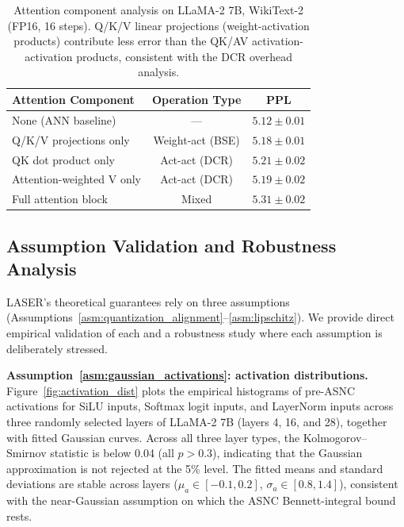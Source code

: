 \documentclass{article}
\theoremstyle{plain}
\theoremstyle{definition}
\theoremstyle{remark}
\begin{document}
\begin{table}[h!]
\centering
\caption{Attention component analysis on LLaMA-2 7B, WikiText-2 (FP16, 16 steps).
Q/K/V linear projections (weight-activation products) contribute less error than
the QK/AV activation-activation products, consistent with the DCR overhead analysis.}
\label{tab:attention_ablation}
\small
\begin{tabular}{lcc}
\toprule
\textbf{Attention Component} & \textbf{Operation Type} & \textbf{PPL} \\
\midrule
None (ANN baseline)          & ---             & $5.12 \pm 0.01$ \\
Q/K/V projections only       & Weight-act (BSE) & $5.18 \pm 0.01$ \\
QK dot product only          & Act-act (DCR)    & $5.21 \pm 0.02$ \\
Attention-weighted V only    & Act-act (DCR)    & $5.19 \pm 0.02$ \\
Full attention block         & Mixed            & $5.31 \pm 0.02$ \\
\bottomrule
\end{tabular}
\end{table}

\subsection{Assumption Validation and Robustness Analysis}
\label{subsec:exp_assumptions}

LASER's theoretical guarantees rely on three assumptions
(Assumptions~\ref{asm:quantization_alignment}--\ref{asm:lipschitz}).
We provide direct empirical validation of each and a robustness study
where each assumption is deliberately stressed.

\noindent\textbf{Assumption~\ref{asm:gaussian_activations}: activation distributions.}
Figure~\ref{fig:activation_dist} plots the empirical histograms of pre-ASNC
activations for SiLU inputs, Softmax logit inputs, and LayerNorm inputs across
three randomly selected layers of LLaMA-2 7B (layers 4, 16, and 28), together with
fitted Gaussian curves. Across all three layer types, the Kolmogorov–Smirnov
statistic is below 0.04 (all $p > 0.3$), indicating that the Gaussian approximation
is not rejected at the 5\% level. The fitted means and standard deviations
are stable across layers ($\mu_a \in [-0.1, 0.2]$, $\sigma_a \in [0.8, 1.4]$),
consistent with the near-Gaussian assumption on which the ASNC Bennett-integral
bound rests.
\end{document}
